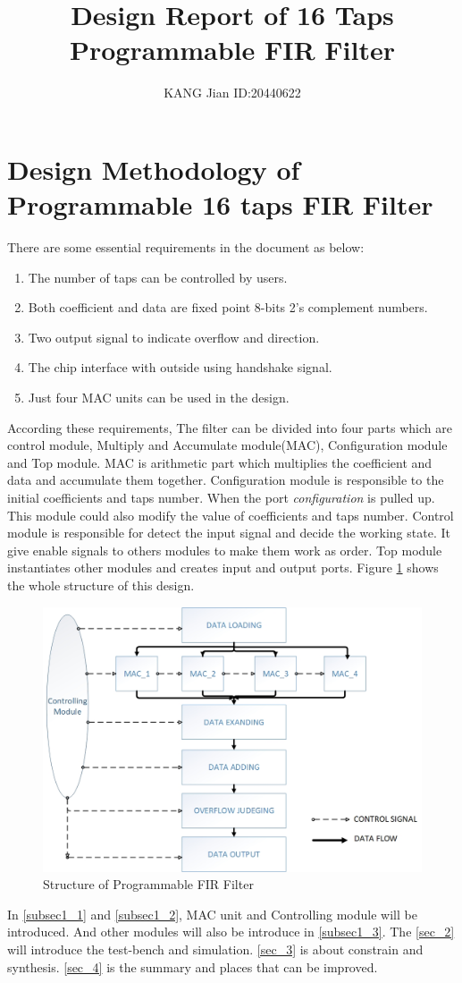 \documentclass[a4paper]{article}
\begin{document}
\title{Design Report of 16 Taps Programmable FIR Filter}
\author{KANG Jian \qquad ID:20440622}
\date{}
\maketitle
\section{Design Methodology of Programmable 16 taps FIR Filter}
There are some essential requirements in the document as below:
\begin{enumerate}[1)]
\item The number of taps can be controlled by users.
\item Both coefficient and data are fixed point 8-bits 2’s complement numbers.
\item Two output signal to indicate overflow and direction.
\item The chip interface with outside using handshake signal.
\item Just four MAC units can be used in the design.
\end{enumerate}
According these requirements, The filter can be divided into four parts which are control module, Multiply and Accumulate module(MAC), Configuration module and Top module. MAC is arithmetic part which multiplies the coefficient and data and accumulate them together. Configuration module is responsible to the initial coefficients and taps number. When the port \emph{configuration} is pulled up. This module could also modify the value of coefficients and taps number. Control module is responsible for detect the input signal and decide the working state. It give enable signals to others modules to make them work as order. Top module instantiates other modules and creates input and output ports. Figure \ref{fig:16_FIR} shows the whole structure of this design. 
\begin{figure}[htb]
\centering
\includegraphics[scale=0.5]{pic/FIR_structure}
\caption{Structure of Programmable FIR Filter}
\label{fig:16_FIR}
\end{figure}
In \ref{subsec1_1} and \ref{subsec1_2}, MAC unit and Controlling module will be introduced. And other modules will also be introduce in \ref{subsec1_3}. The \ref{sec_2} will introduce the test-bench and simulation. \ref{sec_3} is about constrain and synthesis. \ref{sec_4} is the summary and places that can be improved.
\end{document}
